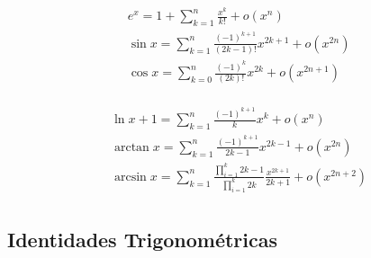 \begin{minipage}{0.55\textwidth}
\begin{equation}
\begin{split}
    & e^x = 1+\sum_{k=1}^n \frac{x^k}{k!} + o(x^n)\\
    & \sin{x} = \sum_{k=1}^n \frac{(-1)^{k+1}}{(2k-1)!}x^{2k+1} +o(x^{2n})\\
    & \cos{x} = \sum_{k=0}^n \frac{(-1)^k}{(2k)!}x^{2k} +o(x^{2n+1})\\
\end{split}
\nonumber
\end{equation}
\end{minipage}
\begin{minipage}{0.55\textwidth}
\begin{equation}
\begin{split}
    & \ln{x+1} = \sum_{k=1}^n \frac{(-1)^{k+1}}{k}x^k +o(x^n)\\
    & \arctan{x} = \sum_{k=1}^n\frac{(-1)^{k+1}}{2k-1}x^{2k-1} +o(x^{2n})\\
    &\arcsin{x} = \sum_{k=1}^n\frac{\prod_{i=1}^k2k-1}{\prod_{i=1}^k2k}
    \frac{x^{2k+1}}{2k+1}+o(x^{2n+2})\\
\end{split}
\nonumber
\end{equation}
\end{minipage}

\subsection{Identidades Trigonométricas}

